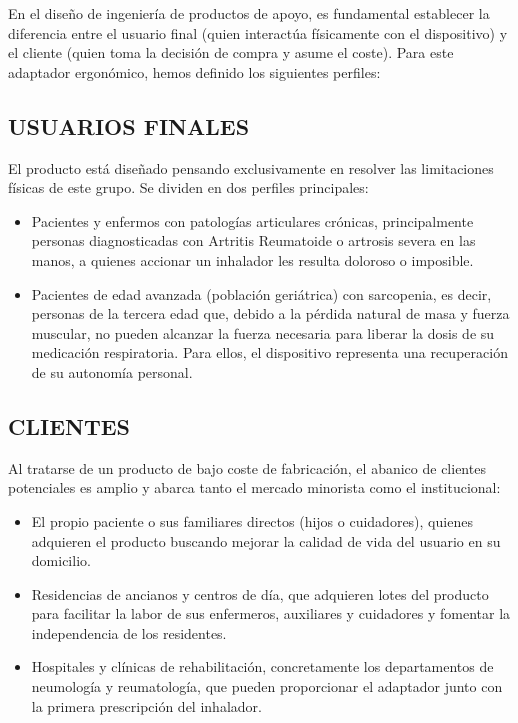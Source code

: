 \documentclass[11pt,a4paper]{article}
\begin{document}
En el diseño de ingeniería de productos de apoyo, es fundamental establecer la diferencia entre el usuario final (quien interactúa físicamente con el dispositivo) y el cliente (quien toma la decisión de compra y asume el coste). Para este adaptador ergonómico, hemos definido los siguientes perfiles:


\subsection{USUARIOS FINALES}
El producto está diseñado pensando exclusivamente en resolver las limitaciones físicas de este grupo. Se dividen en dos perfiles principales:
\begin{itemize}
    \item Pacientes y enfermos con patologías articulares crónicas, principalmente personas diagnosticadas con Artritis Reumatoide o artrosis severa en las manos, a quienes accionar un inhalador les resulta doloroso o imposible.
    \item Pacientes de edad avanzada (población geriátrica) con sarcopenia, es decir, personas de la tercera edad que, debido a la pérdida natural de masa y fuerza muscular, no pueden alcanzar la fuerza necesaria para liberar la dosis de su medicación respiratoria. Para ellos, el dispositivo representa una recuperación de su autonomía personal.
\end{itemize}


\subsection{CLIENTES}
Al tratarse de un producto de bajo coste de fabricación, el abanico de clientes potenciales es amplio y abarca tanto el mercado minorista como el institucional:
\begin{itemize}
    \item El propio paciente o sus familiares directos (hijos o cuidadores), quienes adquieren el producto buscando mejorar la calidad de vida del usuario en su domicilio.
    \item Residencias de ancianos y centros de día, que adquieren lotes del producto para facilitar la labor de sus enfermeros, auxiliares y cuidadores y fomentar la independencia de los residentes.
    \item Hospitales y clínicas de rehabilitación, concretamente los departamentos de neumología y reumatología, que pueden proporcionar el adaptador junto con la primera prescripción del inhalador.
        
\end{itemize}
\end{document}
